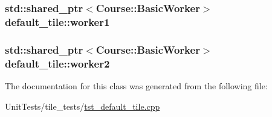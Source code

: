 \hypertarget{classdefault__tile_a15da0582e401dfe74e37fc3d6e27931a}{
\subsubsection[{worker1}]{\setlength{\rightskip}{0pt plus 5cm}std\-::shared\-\_\-ptr$<${\bf Course\-::\-Basic\-Worker}$>$ default\-\_\-tile\-::worker1\hspace{0.3cm}{\ttfamily [private]}}}\label{classdefault__tile_a15da0582e401dfe74e37fc3d6e27931a}
\hypertarget{classdefault__tile_ace6e1dbaff450508a5889ccc10190da5}{
\subsubsection[{worker2}]{\setlength{\rightskip}{0pt plus 5cm}std\-::shared\-\_\-ptr$<${\bf Course\-::\-Basic\-Worker}$>$ default\-\_\-tile\-::worker2\hspace{0.3cm}{\ttfamily [private]}}}\label{classdefault__tile_ace6e1dbaff450508a5889ccc10190da5}


The documentation for this class was generated from the following file\-:\begin{DoxyCompactItemize}
\item 
Unit\-Tests/tile\-\_\-tests/\hyperlink{tst__default__tile_8cpp}{tst\-\_\-default\-\_\-tile.\-cpp}\end{DoxyCompactItemize}
